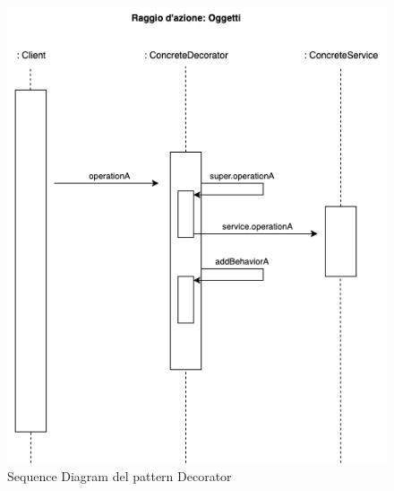 \begin{figure}[H]
    \centering
    \includegraphics[width=1\linewidth]{assets/pattern/decorator/decorator-sequence.drawio.png}
    \caption{Sequence Diagram del pattern Decorator}
\end{figure}


\newpage